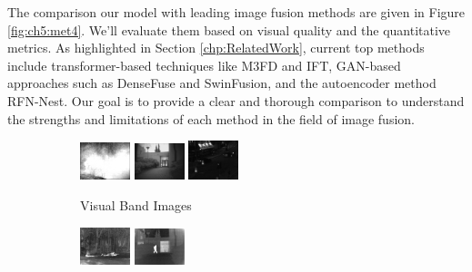 The comparison our model with leading image fusion methods are given in Figure \ref{fig:ch5:met4}. We'll evaluate them based on visual quality and the quantitative metrics. As highlighted in Section \ref{chp:RelatedWork}, current top methods include transformer-based techniques like M3FD\cite{liu2022target} and IFT\cite{vs2022image}, GAN-based approaches such as DenseFuse\cite{li2019infrared} and SwinFusion\cite{ma2022swinfusion}, and the autoencoder method RFN-Nest\cite{li2021rfn}. Our goal is to provide a clear and thorough comparison to understand the strengths and limitations of each method in the field of image fusion.

\begin{figure}[htbp]
    \centering
    \begin{subfigure}[b]{\textwidth}
        \includegraphics[width=0.16\textwidth, height=0.1\textheight]{imgs/ch5/vis/20.png}
        \includegraphics[width=0.16\textwidth, height=0.1\textheight]{imgs/ch5/vis/12.png}
        \includegraphics[width=0.16\textwidth, height=0.1\textheight]{imgs/ch5/vis/02.png}
        \captionsetup{justification=raggedright,singlelinecheck=false}
        \caption{Visual Band Images}
        \label{fig:ch5:met9:vis}
    \end{subfigure}
    \vspace{0.01cm}
    \begin{subfigure}[b]{\textwidth}
        \includegraphics[width=0.16\textwidth, height=0.1\textheight]{imgs/ch5/ir/20.png}
        \includegraphics[width=0.16\textwidth, height=0.1\textheight]{imgs/ch5/ir/12.png}

\end{subfigure}
\end{figure}
